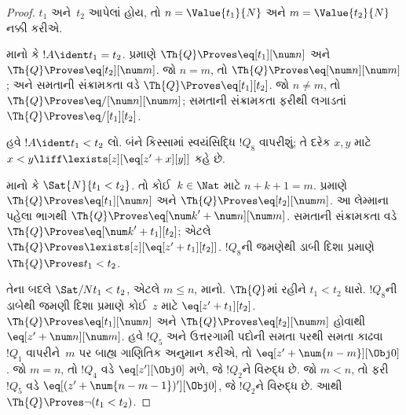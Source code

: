 \documentclass[../../../include/open-logic-section]{subfiles}
\begin{document}
\begin{proof}
$t_1$ અને~$t_2$ આપેલાં હોય,
તો $n = \Value{t_1}{N}$ અને
$m = \Value{t_2}{N}$ નક્કી કરીએ.

માનો કે $!A \ident t_1 = t_2$.
પ્રમાણે $\Th{Q} \Proves
\eq[t_1][\num n]$ અને
$\Th{Q} \Proves \eq[t_2][\num m]$.
જો $n = m$, તો
$\Th{Q} \Proves \eq[\num n][\num m]$;
અને સમતાની સંક્રામકતા વડે
$\Th{Q} \Proves \eq[t_1][t_2]$.
જો $n \neq m$, તો
$\Th{Q} \Proves \eq/[\num n][\num m]$;
સમતાની સંક્રામકતા ફરીથી
લગાડતાં $\Th{Q} \Proves
\eq/[t_1][t_2]$.

હવે $!A \ident t_1 < t_2$
લો. બંને કિસ્સામાં સ્વયંસિદ્ધિ
$!Q_8$ વાપરીશું; તે દરેક
$x,y$ માટે
$x < y \liff
\lexists[z][\eq[z' + x][y]]$
કહે છે.

માનો કે $\Sat{N}{t_1 < t_2}$.
તો કોઈ~$k \in \Nat$ માટે
$n + k + 1 = m$.
પ્રમાણે $\Th{Q} \Proves
\eq[t_1][\num n]$ અને
$\Th{Q} \Proves \eq[t_2][\num m]$.
આ લેમ્માના પહેલા ભાગથી
$\Th{Q} \Proves
\eq[{\num k}' + \num n][\num m]$.
સમતાની સંક્રામકતા વડે
$\Th{Q} \Proves
\eq[{\num k}' + t_1][t_2]$;
એટલે $\Th{Q} \Proves
\lexists[z][\eq[z' + t_1][t_2]]$.
$!Q_8$ની જમણેથી ડાબી
દિશા પ્રમાણે $\Th{Q} \Proves
t_1 < t_2$.

તેના બદલે $\Sat/{N}{t_1 < t_2}$,
એટલે $m \leq n$, માનો.
%
$\Th{Q}$માં રહીને
$t_1 < t_2$ ધારો. $!Q_8$ની
ડાબેથી જમણી દિશા પ્રમાણે
કોઈ~$z$ માટે
$\eq[z' + t_1][t_2]$.
$\Th{Q} \Proves
\eq[t_1][\num n]$ અને
$\Th{Q} \Proves \eq[t_2][\num m]$
હોવાથી
$\eq[z' + \num n][\num m]$.
%
હવે $!Q_5$ અને ઉત્તરગામી પદોની સમતા પરથી
સમતા કાઢવા $!Q_1$ વાપરીને~$m$
પર બાહ્ય ગાણિતિક અનુમાન કરીએ, તો
$\eq[z' + \num{n - m}][\Obj 0]$.
જો $m = n$, તો $!Q_4$
વડે $\eq[z'][\Obj 0]$ મળે,
જે $!Q_2$ને વિરુદ્ધ છે.
જો $m < n$, તો ફરી~$!Q_5$
વડે
$\eq[(z' + \num{n - m - 1})'][\Obj 0]$,
જે $!Q_2$ને વિરુદ્ધ છે.
આથી $\Th{Q} \Proves
\lnot(t_1 < t_2)$.
\end{proof}
\end{document}
